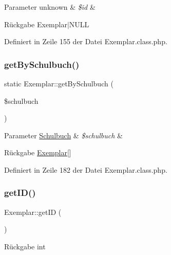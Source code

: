 \begin{DoxyParams}[1]{Parameter}
unknown & {\em \$id} & \\
\hline
\end{DoxyParams}
\begin{DoxyReturn}{Rückgabe}
Exemplar$\vert$\+N\+U\+LL 
\end{DoxyReturn}


Definiert in Zeile 155 der Datei Exemplar.\+class.\+php.

\mbox{\label{class_exemplar_a0803f8a7d209491b1ad4ed6e3acb9c6b}} 
\subsubsection{\texorpdfstring{get\+By\+Schulbuch()}{getBySchulbuch()}}
{\footnotesize\ttfamily static Exemplar\+::get\+By\+Schulbuch (\begin{DoxyParamCaption}\item[{}]{\$schulbuch }\end{DoxyParamCaption})\hspace{0.3cm}{\ttfamily [static]}}


\begin{DoxyParams}[1]{Parameter}
\mbox{\hyperlink{class_schulbuch}{Schulbuch}} & {\em \$schulbuch} & \\
\hline
\end{DoxyParams}
\begin{DoxyReturn}{Rückgabe}
\mbox{\hyperlink{class_exemplar}{Exemplar}}\mbox{[}\mbox{]} 
\end{DoxyReturn}


Definiert in Zeile 182 der Datei Exemplar.\+class.\+php.

\mbox{\label{class_exemplar_a3fe13dc1e6991a8506858d2a33ed0493}} 
\subsubsection{\texorpdfstring{get\+I\+D()}{getID()}}
{\footnotesize\ttfamily Exemplar\+::get\+ID (\begin{DoxyParamCaption}{ }\end{DoxyParamCaption})}

\begin{DoxyReturn}{Rückgabe}
int 
\end{DoxyReturn}


